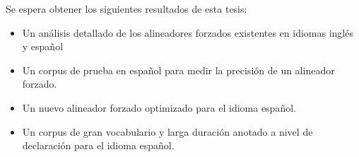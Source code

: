 Se espera obtener los siguientes resultados de esta tesis:

\begin{itemize}
    \item Un análisis detallado de los alineadores forzados existentes en idiomas inglés y español
    \item Un corpus de prueba en español para medir la precisión de un alineador forzado.
    \item Un nuevo alineador forzado optimizado para el idioma español.
    \item Un corpus de gran vocabulario y larga duración anotado a nivel de declaración para el idioma español.
\end{itemize}






